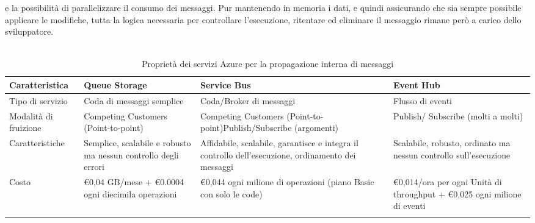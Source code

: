 e la possibilità di parallelizzare il consumo dei messaggi.
Pur mantenendo in memoria i dati, 
e quindi assicurando che sia sempre possibile applicare le modifiche,
tutta la logica necessaria per controllare l'esecuzione, ritentare ed eliminare il messaggio 
rimane però a carico dello sviluppatore.\\
\\
\begin{longtable}{|P{2.9cm}|P{3.9cm}|P{3.9cm}|P{3.9cm}|}
    \hline
    \textbf{Caratteristica}&\textbf{Queue Storage}      & \textbf{Service Bus} & \textbf{Event Hub}\\
    \hline
    \endhead
    Tipo di servizio     & Coda di messaggi semplice   & Coda/Broker di messaggi & Flusso di eventi                               \\
    \hline
    Modalità di fruizione &  Competing Customers (Point-to-point) & Competing Customers (Point-to-point)\newline Publish/Subscribe (argomenti) & Publish/ Subscribe (molti a molti)                               \\
    \hline
    Caratteristiche & Semplice, scalabile e robusto ma nessun controllo degli errori & Affidabile, scalabile, garantisce e integra il controllo dell'esecuzione, ordinamento dei messaggi & Scalabile, robusto, ordinato ma nessun controllo sull'esecuzione\\
    \hline
    Costo & €0,04 GB/mese + €0.0004 ogni diecimila operazioni & €0,044 ogni milione di operazioni (piano Basic con solo le code)& €0,014/ora per ogni Unità di throughput + €0,025 ogni milione di eventi\\
    \hline
    \caption{Proprietà dei servizi Azure per la propagazione interna di messaggi }
\end{longtable}

